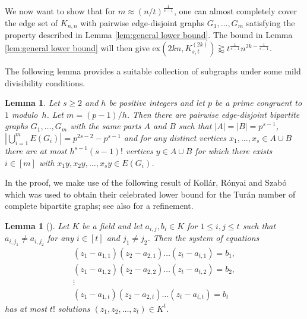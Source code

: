 \documentclass[a4paper,11pt]{article}
\newtheorem{lemma}[theorem]{\bf Lemma}
\theoremstyle{definition}
\def\ex{\mathrm{ex}}
\begin{document}
We now want to show that for $m\approx (n/t)^{\frac{1}{s-1}}$, one can almost completely cover the edge set of $K_{n,n}$ with pairwise edge-disjoint graphs $G_1,\dots,G_m$ satisfying the property described in Lemma \ref{lem:general lower bound}. The bound in Lemma \ref{lem:general lower bound} will then give $\ex(2kn,K_{s,t}^{(2k)})\gtrapprox t^{\frac{1}{s-1}}n^{2k-\frac{1}{s-1}}$.

The following lemma provides a suitable collection of subgraphs under some mild divisibility conditions.

\begin{lemma} \label{lem:good partition exists}
    Let $s\geq 2$ and $h$ be positive integers and let $p$ be a prime congruent to $1$ modulo~$h$. Let $m=(p-1)/h$. Then there are pairwise edge-disjoint bipartite graphs $G_1,\dots,G_{m}$ with the same parts $A$ and $B$ such that $|A|=|B|=p^{s-1}$, $|\bigcup_{i=1}^{m} E(G_i)|=p^{2s-2}-p^{s-1}$ and for any distinct vertices $x_1,\dots,x_s\in A\cup B$ there are at most $h^{s-1}(s-1)!$ vertices $y\in A\cup B$ for which there exists $i\in [m]$ with $x_1y,x_2y,\dots,x_sy\in E(G_i)$.
\end{lemma}

In the proof, we make use of the following result of Koll\'ar, R\'onyai and Szab\'o which was used to obtain their celebrated lower bound for the Tur\'an number of complete bipartite graphs; see also \cite{ALON1999280} for a refinement.

\begin{lemma}[{\cite[Theorem 3.3]{KRS96}}] \label{lem:KRS}
    Let $K$ be a field and let $a_{i,j},b_i\in K$ for $1\leq i,j\leq t$ such that $a_{i,j_1}\neq a_{i,j_2}$ for any $i\in [t]$ and $j_1\neq j_2$. Then the system of equations
    \begin{gather*}
        (z_1-a_{1,1})(z_2-a_{2,1})\dots (z_t-a_{t,1})=b_1, \\
        (z_1-a_{1,2})(z_2-a_{2,2})\dots (z_t-a_{t,2})=b_2, \\
         \vdots \\
        (z_1-a_{1,t})(z_2-a_{2,t})\dots (z_t-a_{t,t})=b_t
    \end{gather*}
    has at most $t!$ solutions $(z_1,z_2,\dots,z_t)\in K^t$.
\end{lemma}
\end{document}
